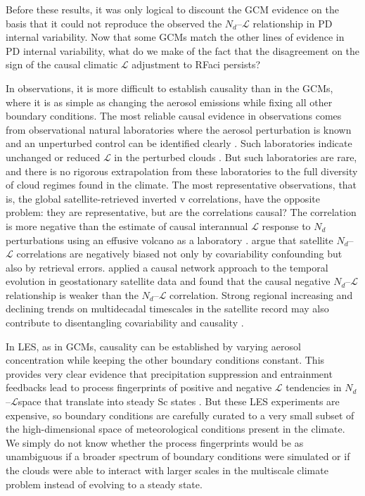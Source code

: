 \documentclass[acp, manuscript]{copernicus}\usepackage[]{graphicx}\usepackage[]{xcolor}
\newcommand\nd{\ensuremath{N_d}}
\newcommand\lwp{\ensuremath{\mathcal L}}
\begin{document}
Before these results, it was only logical to discount the GCM evidence on the
basis that it could not reproduce the observed the \nd--\lwp{} relationship in
PD internal variability.  Now that some GCMs match the other lines of evidence
in PD internal variability,
what do we make of the fact that the disagreement on the sign of the causal climatic \lwp{}
adjustment to RFaci persists?

In observations, it is more difficult to establish causality than in the GCMs,
where it is as simple as changing the aerosol emissions while fixing all other
boundary conditions.  The most reliable causal evidence in observations comes
from observational natural laboratories where the aerosol perturbation is known and
an unperturbed control can be identified clearly \citep{Christensen2022}.  Such
laboratories indicate unchanged or reduced \lwp{} in the perturbed clouds
\citep{Malavelle2017,Toll2019,Diamond2020}.  But such laboratories are rare, and
there is no rigorous extrapolation from these laboratories to the full diversity
of cloud regimes found in the climate.  The most representative observations,
that is, the global satellite-retrieved inverted v correlations, have the
opposite problem: they are representative, but are the correlations causal?  The
correlation is more negative than the estimate of causal interannual \lwp{}
response to \nd{} perturbations using an effusive volcano as a laboratory
\citep[][albeit for shallow Cu rather than Sc]{Gryspeerdt2019}.  \citet{Arola2022} argue that
satellite \nd--\lwp{} correlations are negatively biased not only by
covariability confounding but also by retrieval errors.  \citet{Fons2023}
applied a causal network approach to the temporal evolution in geostationary
satellite data and found that the causal negative \nd--\lwp{} relationship is
weaker than the \nd--\lwp{} correlation.  Strong regional increasing and
declining trends on multidecadal timescales in the satellite record may also
contribute to disentangling covariability and causality \citep{quaas2022}.

In LES, as in GCMs, causality can be established by varying aerosol
concentration while keeping the other boundary conditions constant.  This
provides very clear evidence that precipitation suppression and entrainment
feedbacks lead to process fingerprints of positive and negative \lwp{}
tendencies in \nd--\lwp space \citep{Hoffmann2020} that translate into steady
Sc states \citep{Glassmeier2021}.  But these LES experiments are expensive, so
boundary conditions are carefully curated to a very small subset of the
high-dimensional space of meteorological conditions present in the climate.  We
simply do not know whether the process fingerprints would be as unambiguous if a
broader spectrum of boundary conditions were simulated or if the clouds were
able to interact with larger scales in
the multiscale climate problem \citep{Kazil2021} instead of evolving to a steady state.
\end{document}
